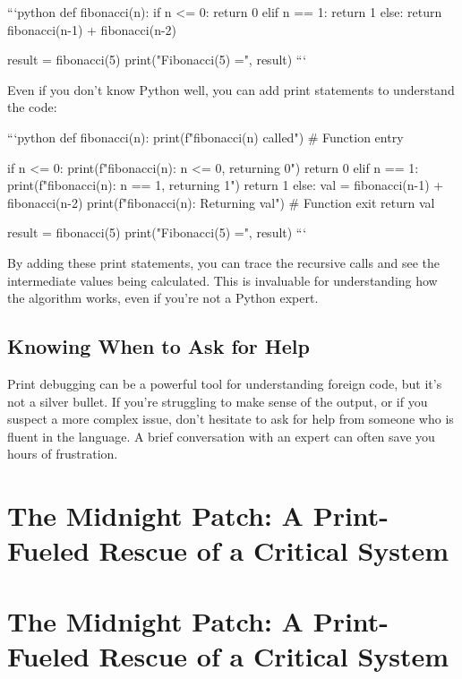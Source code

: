 \documentclass{article}
\begin{document}
{{{{```python
def fibonacci(n):
    if n <= 0:
        return 0
    elif n == 1:
        return 1
    else:
        return fibonacci(n-1) + fibonacci(n-2)

result = fibonacci(5)
print("Fibonacci(5) =", result)
```

Even if you don't know Python well, you can add print statements to understand the code:

```python
def fibonacci(n):
    print(f"fibonacci({n}) called") # Function entry

    if n <= 0:
        print(f"fibonacci({n}): n <= 0, returning 0")
        return 0
    elif n == 1:
        print(f"fibonacci({n}): n == 1, returning 1")
        return 1
    else:
        val = fibonacci(n-1) + fibonacci(n-2)
        print(f"fibonacci({n}): Returning {val}") # Function exit
        return val

result = fibonacci(5)
print("Fibonacci(5) =", result)
```

By adding these print statements, you can trace the recursive calls and see the intermediate values being calculated. This is invaluable for understanding how the algorithm works, even if you're not a Python expert.

\subsection*{Knowing When to Ask for Help}

Print debugging can be a powerful tool for understanding foreign code, but it's not a silver bullet. If you're struggling to make sense of the output, or if you suspect a more complex issue, don't hesitate to ask for help from someone who is fluent in the language. A brief conversation with an expert can often save you hours of frustration.

\newpage

\section*{The Midnight Patch: A Print-Fueled Rescue of a Critical System} %
\label{chapter-8-9-The_Midnight_Patch__A_Print-Fueled_Rescu}

\section*{The Midnight Patch: A Print-Fueled Rescue of a Critical System}

}}}}
\end{document}
